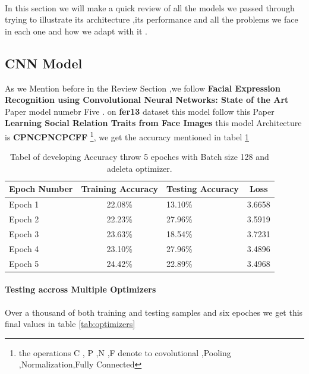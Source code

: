 \paragraph{}
In this section we will make a quick review of all the models we passed through trying to illustrate its architecture ,its performance and all the problems we face in each one and how we adapt with it .
\subsection{CNN Model}
As we Mention before in the Review Section ,we follow \textbf{Facial Expression Recognition using Convolutional Neural Networks: State of the Art} Paper\cite{state_of_art} model numebr Five .
on \textbf{fer13} dataset this model follow this Paper \textbf{Learning Social Relation Traits from Face Images} this model Architecture is \textbf{CPNCPNCPCFF} \footnote{ the operations C , P ,N ,F denote to covolutional ,Pooling ,Normalization,Fully Connected }, we get the accuracy mentioned in tabel \ref{tab:14model}
\begin{table}[h!]
	\begin{center}
		\caption{Tabel of developing Accuracy throw  5 epoches with Batch size 128 and adeleta optimizer.}
		\label{tab:14model}
		\begin{tabular}{l|c|l|c}
			\textbf{Epoch Number} & \textbf{Training Accuracy} & \textbf{Testing Accuracy} &\textbf{Loss}\\ 
			\hline 
			Epoch 1 & 22.08\% & 13.10\% & 3.6658 \\
			Epoch 2 & 22.23\% & 27.96\% & 3.5919 \\
			Epoch 3 & 23.63\% & 18.54\% & 3.7231 \\
			Epoch 4 & 23.10\% & 27.96\% & 3.4896 \\
			Epoch 5 & 24.42\% & 22.89\% &  3.4968 \\									
			\end{tabular}
	\end{center}

\end{table}
\paragraph{Testing accross Multiple Optimizers}
Over a thousand of both training and testing samples and six epoches we get this final values in table \ref{tab:optimizers}

